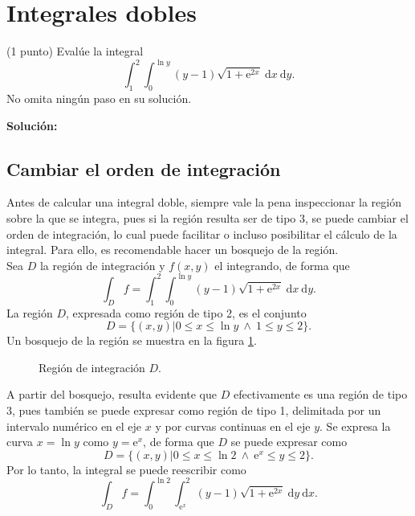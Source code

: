 \documentclass{fmbvecto}
\begin{document}
\section{Integrales dobles}

\begin{problema}
    
    (1 punto) Evalúe la integral \[ \int_{1}^{2} \int_{0}^{\ln y} (y-1) \sqrt{1 + \mathrm{e}^{2x}} \: \mathrm{d}x \: \mathrm{d}y. \] No omita ningún paso en su solución.


\vspace{1em}
\tcblower
\textbf{Solución:}

    \subsection{Cambiar el orden de integración}

    Antes de calcular una integral doble, siempre vale la pena inspeccionar la región sobre la que se integra, pues si la región resulta ser de tipo 3, se puede cambiar el orden de integración, lo cual puede facilitar o incluso posibilitar el cálculo de la integral. Para ello, es recomendable hacer un bosquejo de la región. \\
    
    Sea \(D\) la región de integración y \(f(x, y)\) el integrando, de forma que \[ \int_D f = \int_{1}^{2} \int_{0}^{\ln y} (y-1) \sqrt{1 + \mathrm{e}^{2x}} \: \mathrm{d}x \: \mathrm{d}y. \]
    La región \(D\), expresada como región de tipo 2, es el conjunto
    \[D = \{(x, y) | 0 \leq x \leq \ln y \ \land \ 1 \leq y \leq 2\}.\]
    Un bosquejo de la región se muestra en la figura \ref{fig:region-tipo-3}.
    \begin{figure}[H]
        \centering
        \caption{Región de integración \(D\).}
        \label{fig:region-tipo-3}
    \end{figure}

    A partir del bosquejo, resulta evidente que \(D\) efectivamente es una región de tipo 3, pues también se puede expresar como región de tipo 1, delimitada por un intervalo numérico en el eje \(x\) y por curvas continuas en el eje \(y\). Se expresa la curva \(x = \ln y\) como \(y = \mathrm{e}^x\), de forma que \(D\) se puede expresar como
    \[D = \{(x, y) | 0 \leq x \leq \ln 2 \ \land \ \mathrm{e}^x \leq y \leq 2\}.\]
    Por lo tanto, la integral se puede reescribir como
    \[ \int_D f = \int_{0}^{\ln 2} \int_{\mathrm{e}^x}^{2} (y-1) \sqrt{1 + \mathrm{e}^{2x}} \: \mathrm{d}y \: \mathrm{d}x. \]


\end{problema}
\end{document}
